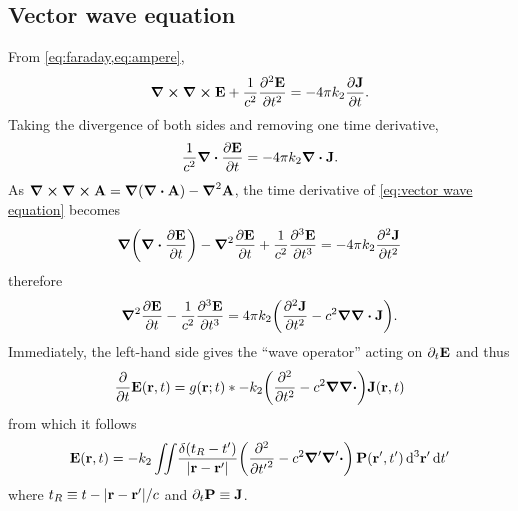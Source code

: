 \subsection{\label{appendix:vector wave equation}Vector wave equation}

From \cref{eq:faraday,eq:ampere},
\begin{equation}
  \curl{\curl{\vb{E}}} + \frac{1}{c^2} \pdv[2]{\vb{E}}{t} = -4\pi k_2 \pdv{\vb{J}}{t}.
  \label{eq:vector wave equation}
\end{equation}
Taking the divergence of both sides and removing one time derivative,
\begin{equation*}
  \frac{1}{c^2} \div{\pdv{\vb{E}}{t}} = -4 \pi k_2 \div{\vb{J}}.
\end{equation*}
As $\curl{\curl{\vb{A}}} = \grad{\qty(\div{\vb{A}})} - \grad^2{\vb{A}}$, the time derivative of \cref{eq:vector wave equation} becomes
\begin{equation*}
  \grad{\qty(\div{\pdv{\vb{E}}{t}})} - \grad^2 \pdv{\vb{E}}{t} + \frac{1}{c^2} \pdv[3]{\vb{E}}{t} = -4\pi k_2 \pdv[2]{\vb{J}}{t}
\end{equation*}
therefore
\begin{equation*}
  \grad^2 \pdv{\vb{E}}{t} - \frac{1}{c^2} \pdv[3]{\vb{E}}{t} = 4\pi k_2 \qty(\pdv[2]{\vb{J}}{t} - c^2 \grad \div{\vb{J}}).
\end{equation*}
Immediately, the left-hand side gives the ``wave operator'' acting on $\partial_t \vb{E}$ and thus
\begin{equation*}
  \pdv{t} \vb{E}(\vb{r}, t) = g(\vb{r}; t) \ast -k_2\qty(\pdv[2]{t} - c^2 \grad \div) \vb{J}(\vb{r}, t)
\end{equation*}
from which it follows
\begin{equation}
  \vb{E}(\vb{r}, t) = -k_2 \siint \kern0.1em \frac{\delta\qty(t_R - t' )}{\abs{\vb{r} - \vb{r}'}} \qty(\pdv[2]{{t'}} - c^2 \grad' \grad'\boldsymbol{\cdot}) \, \vb{P}(\vb{r}', t') \dd[3]{\vb{r}'} \dd{t'}
\end{equation}
where $t_R \equiv t - \abs{\vb{r} - \vb{r}'}/c$ and $\partial_t \vb{P} \equiv \vb{J}$.

